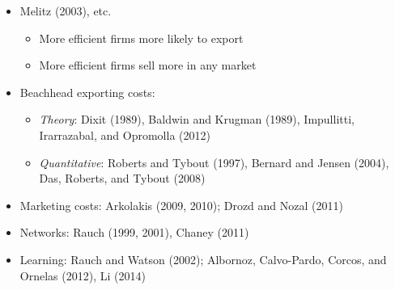 \documentclass[notes=show]{beamer}
\begin{document}
\begin{frame}%


\begin{itemize}
\item Melitz (2003), etc.

\begin{itemize}
\item More efficient firms more likely to export

\item More efficient firms sell more in any market
\end{itemize}

\item Beachhead exporting costs:

\begin{itemize}
\item \textit{Theory}: Dixit (1989), Baldwin and Krugman (1989), Impullitti,
Irarrazabal, and Opromolla (2012)

\item \textit{Quantitative}: Roberts and Tybout (1997), Bernard and Jensen
(2004), Das, Roberts, and Tybout (2008)
\end{itemize}

\item Marketing costs: Arkolakis (2009, 2010); Drozd and Nozal (2011)

\item Networks: Rauch (1999, 2001), Chaney (2011)

\item Learning: Rauch and Watson (2002); Albornoz, Calvo-Pardo, Corcos, and
Ornelas (2012), Li (2014)
\end{itemize}

\end{frame}%
\end{document}
